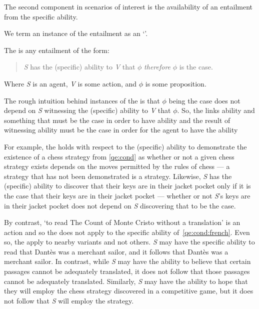 \begin{note}[\aben{}]
  The second component in scenarios of interest is the availability of an entailment from the specific ability.

  We term an instance of the entailment as an `\aben{}'.

  \begin{definition}
    The \aben{} is any entailment of the form:
    \begin{quote}
      \emph{S} has the (specific) ability to \emph{V} that \(\phi\) \emph{therefore} \(\phi\) is the case.
    \end{quote}
    Where \emph{S} is an agent, \emph{V} is some action, and \(\phi\) is some proposition.
  \end{definition}

  The rough intuition behind instances of the \aben{} is that \(\phi\) being the case does not depend on \emph{S} witnessing the (specific) ability to \emph{V} that \(\phi\).
  So, the \aben{} links ability and something that must be the case in order to have ability and the result of witnessing ability must be the case in order for the agent to have the ability

  For example, the \aben{} holds with respect to the (specific) ability to demonstrate the existence of a chess strategy from \ref{qe:cond} as whether or not a given chess strategy exists depends on the moves permitted by the rules of chess --- a strategy that has not been demonstrated is a strategy.
  Likewise, \emph{S} has the (specific) ability to discover that their keys are in their jacket pocket only if it is the case that their keys are in their jacket pocket --- whether or not \emph{S}'s keys are in their jacket pocket does not depend on \emph{S} discovering that to be the case.

  By contrast, `to read The Count of Monte Cristo without a translation' is an action and so the \aben{} does not apply to the specific ability of~\ref{qe:cond:french}.
  Even so, the \aben{} apply to nearby variants and not others.
  \emph{S} may have the specific ability to read that Dantès was a merchant sailor, and it follows that Dantès was a merchant sailor.
  In contrast, while \emph{S} may have the ability to believe that certain passages cannot be adequately translated, it does not follow that those passages cannot be adequately translated.
  Similarly, \emph{S} may have the ability to hope that they will employ the chess strategy discovered in a competitive game, but it does not follow that \emph{S} will employ the strategy.


\end{note}
